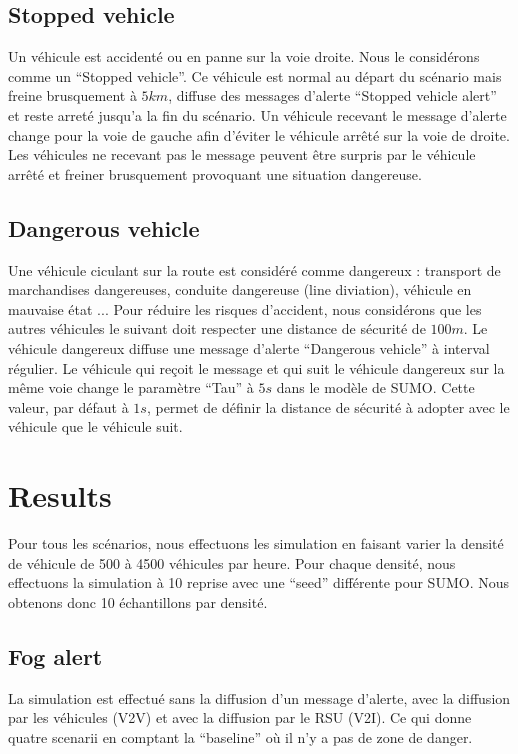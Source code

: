 \documentclass[a4paper,10pt]{article}
\begin{document}
\subsection{Stopped vehicle}

Un véhicule est accidenté ou en panne sur la voie droite. Nous le considérons comme un ``Stopped vehicle''. Ce véhicule est normal au départ du scénario mais freine brusquement à $5 km$, diffuse des messages d'alerte ``Stopped vehicle alert'' et reste arreté jusqu'a la fin du scénario. Un véhicule recevant le message d'alerte change pour la voie de gauche afin d'éviter le véhicule arrêté sur la voie de droite. Les véhicules ne recevant pas le message peuvent être surpris par le véhicule arrêté et freiner brusquement provoquant une situation dangereuse.

\subsection{Dangerous vehicle}

Une véhicule ciculant sur la route est considéré comme dangereux : transport de marchandises dangereuses, conduite dangereuse (line diviation), véhicule en mauvaise état ... Pour réduire les risques d'accident, nous considérons que les autres véhicules le suivant doit respecter une distance de sécurité de $100 m$. Le véhicule dangereux diffuse une message d'alerte ``Dangerous vehicle'' à interval régulier. Le véhicule qui reçoit le message et qui suit le véhicule dangereux sur la même voie change le paramètre ``Tau'' à $5 s$ dans le modèle de SUMO. Cette valeur, par défaut à $1 s$, permet de définir la distance de sécurité à adopter avec le véhicule que le véhicule suit. 

\section{Results}

Pour tous les scénarios, nous effectuons les simulation en faisant varier la densité de véhicule de 500 à 4500 véhicules par heure. Pour chaque densité, nous effectuons la simulation à 10 reprise avec une ``seed'' différente pour SUMO. Nous obtenons donc 10 échantillons par densité.

\subsection{Fog alert}

La simulation est effectué sans la diffusion d'un message d'alerte, avec la diffusion par les véhicules (V2V) et avec la diffusion par le RSU (V2I). Ce qui donne quatre scenarii en comptant la ``baseline'' où il n'y a pas de zone de danger.
\end{document}
